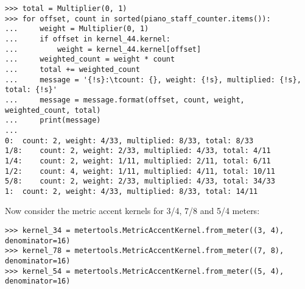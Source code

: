 \begin{comment}
<abjad>
total = Multiplier(0, 1)
for offset, count in sorted(piano_staff_counter.items()):
    weight = Multiplier(0, 1)
    if offset in kernel_44.kernel:
        weight = kernel_44.kernel[offset]
    weighted_count = weight * count
    total += weighted_count
    message = '{!s}:\tcount: {}, weight: {!s}, multiplied: {!s}, total: {!s}'
    message = message.format(offset, count, weight, weighted_count, total)
    print(message)

</abjad>
\end{comment}

\begin{abjadbookoutput}
\begin{singlespacing}
\vspace{-0.5\baselineskip}
\begin{lstlisting}
>>> total = Multiplier(0, 1)
>>> for offset, count in sorted(piano_staff_counter.items()):
...     weight = Multiplier(0, 1)
...     if offset in kernel_44.kernel:
...         weight = kernel_44.kernel[offset]
...     weighted_count = weight * count
...     total += weighted_count
...     message = '{!s}:\tcount: {}, weight: {!s}, multiplied: {!s}, total: {!s}'
...     message = message.format(offset, count, weight, weighted_count, total)
...     print(message)
...
0:	count: 2, weight: 4/33, multiplied: 8/33, total: 8/33
1/8:	count: 2, weight: 2/33, multiplied: 4/33, total: 4/11
1/4:	count: 2, weight: 1/11, multiplied: 2/11, total: 6/11
1/2:	count: 4, weight: 1/11, multiplied: 4/11, total: 10/11
5/8:	count: 2, weight: 2/33, multiplied: 4/33, total: 34/33
1:	count: 2, weight: 4/33, multiplied: 8/33, total: 14/11
\end{lstlisting}
\end{singlespacing}
\end{abjadbookoutput}

\noindent Now consider the metric accent kernels for 3/4, 7/8 and 5/4 meters:

\begin{comment}
<abjad>
kernel_34 = metertools.MetricAccentKernel.from_meter((3, 4), denominator=16)
kernel_78 = metertools.MetricAccentKernel.from_meter((7, 8), denominator=16)
kernel_54 = metertools.MetricAccentKernel.from_meter((5, 4), denominator=16)
</abjad>
\end{comment}

\begin{abjadbookoutput}
\begin{singlespacing}
\vspace{-0.5\baselineskip}
\begin{lstlisting}
>>> kernel_34 = metertools.MetricAccentKernel.from_meter((3, 4), denominator=16)
>>> kernel_78 = metertools.MetricAccentKernel.from_meter((7, 8), denominator=16)
>>> kernel_54 = metertools.MetricAccentKernel.from_meter((5, 4), denominator=16)
\end{lstlisting}
\end{singlespacing}
\end{abjadbookoutput}


